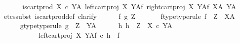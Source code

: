 \begin{isabellebody}
%
\isadelimproof
%
\endisadelimproof
%
\isatagproof
{}\isamarkupfalse%
\ {\isacharminus}{\kern0pt}\ \isanewline
\ \ \isamarkupfalse%
\ {\isachardoublequoteopen}is{\isacharunderscore}{\kern0pt}cart{\isacharunderscore}{\kern0pt}prod\ {\isacharparenleft}{\kern0pt}{\isacharparenleft}{\kern0pt}X\ {\isasymtimes}\isactrlsub c\ Y{\isacharparenright}{\kern0pt}\isactrlbsup A\isactrlesup {\isacharparenright}{\kern0pt}\ {\isacharparenleft}{\kern0pt}{\isacharparenleft}{\kern0pt}left{\isacharunderscore}{\kern0pt}cart{\isacharunderscore}{\kern0pt}proj\ X\ Y{\isacharparenright}{\kern0pt}\isactrlbsup A\isactrlesup \isactrlsub f{\isacharparenright}{\kern0pt}\ {\isacharparenleft}{\kern0pt}right{\isacharunderscore}{\kern0pt}cart{\isacharunderscore}{\kern0pt}proj\ X\ Y\isactrlbsup A\isactrlesup \isactrlsub f{\isacharparenright}{\kern0pt}\ {\isacharparenleft}{\kern0pt}X\isactrlbsup A\isactrlesup {\isacharparenright}{\kern0pt}\ {\isacharparenleft}{\kern0pt}Y\isactrlbsup A\isactrlesup {\isacharparenright}{\kern0pt}{\isachardoublequoteclose}\isanewline
\ \ \isamarkupfalse%
\ {\isacharparenleft}{\kern0pt}etcs{\isacharunderscore}{\kern0pt}subst\ is{\isacharunderscore}{\kern0pt}cart{\isacharunderscore}{\kern0pt}prod{\isacharunderscore}{\kern0pt}def{}{\isacharcomma}{\kern0pt}\ clarify{\isacharparenright}{\kern0pt}\isanewline
\ \ \ \ \isamarkupfalse%
\ f\ g\ Z\ \isanewline
\ \ \ \ \isamarkupfalse%
\ f{\isacharunderscore}{\kern0pt}type{\isacharbrackleft}{\kern0pt}type{\isacharunderscore}{\kern0pt}rule{\isacharbrackright}{\kern0pt}{\isacharcolon}{\kern0pt}\ {\isachardoublequoteopen}f\ {\isacharcolon}{\kern0pt}\ Z\ {\isasymrightarrow}\ X\isactrlbsup A\isactrlesup {\isachardoublequoteclose}\isanewline
\ \ \ \ \isamarkupfalse%
\ g{\isacharunderscore}{\kern0pt}type{\isacharbrackleft}{\kern0pt}type{\isacharunderscore}{\kern0pt}rule{\isacharbrackright}{\kern0pt}{\isacharcolon}{\kern0pt}\ {\isachardoublequoteopen}g\ {\isacharcolon}{\kern0pt}\ Z\ {\isasymrightarrow}\ Y\isactrlbsup A\isactrlesup {\isachardoublequoteclose}\isanewline
\isanewline
\ \ \ \ \isamarkupfalse%
\ {\isachardoublequoteopen}{\isasymexists}h{\isachardot}{\kern0pt}\ h\ {\isacharcolon}{\kern0pt}\ Z\ {\isasymrightarrow}\ {\isacharparenleft}{\kern0pt}X\ {\isasymtimes}\isactrlsub c\ Y{\isacharparenright}{\kern0pt}\isactrlbsup A\isactrlesup \ {\isasymand}\isanewline
\ \ \ \ \ \ \ \ \ \ \ left{\isacharunderscore}{\kern0pt}cart{\isacharunderscore}{\kern0pt}proj\ X\ Y\isactrlbsup A\isactrlesup \isactrlsub f\ {\isasymcirc}\isactrlsub c\ h\ {\isacharequal}{\kern0pt}\ f\ {\isasymand}\isanewline

\end{isabellebody}
